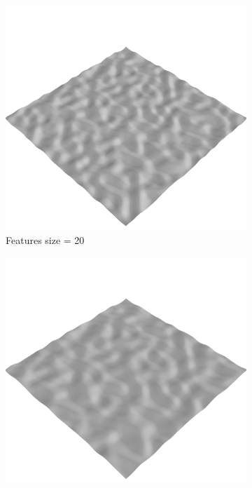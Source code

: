 \documentclass[../document.tex]{subfiles}
\begin{document}
\begin{figure}[H]
\begin{subfigure}[b]{0.32\linewidth}
            \includegraphics[width=\textwidth]{../img/data-aug/3d/simplex2.png}
            \caption{Features size = 20}
            \end{subfigure}    
          \begin{subfigure}[b]{0.32\textwidth}
            \includegraphics[width=\textwidth]{../img/data-aug/3d/simplex3.png}

\end{subfigure}
\end{figure}
\end{document}
